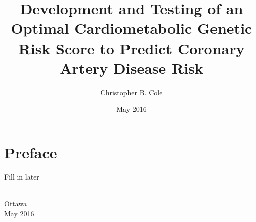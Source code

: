 \documentclass[10pt,a4paper,twoside]{memoir} %
\title{Development and Testing of an Optimal Cardiometabolic Genetic Risk Score to Predict Coronary Artery Disease Risk} %
\author{Christopher B. Cole} %
\date{May 2016} %
\begin{document}
\begin{titlingpage}
\maketitle %
\end{titlingpage}

\frontmatter %


\section*{Preface}

Fill in later

\begin{flushright}
\textsc{\theauthor}\\
Ottawa\\
May 2016
\end{flushright}

\cleartoverso %

\end{document}

